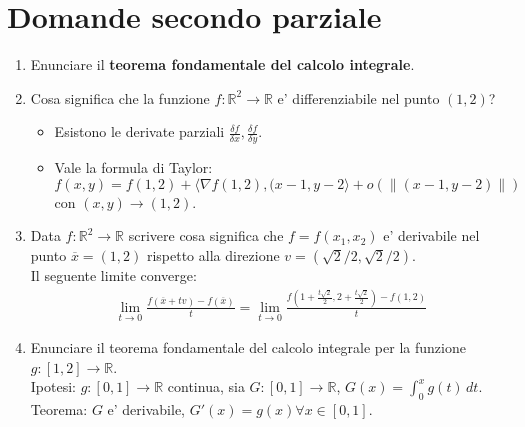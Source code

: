 \documentclass{article}
\begin{document}
\pagebreak
\section{Domande secondo parziale}

\begin{enumerate}
  \item Enunciare il \textbf{teorema fondamentale del calcolo integrale}.
  \item Cosa significa che la funzione $f: \mathbb{R}^2 \to \mathbb{R}$ e'
    differenziabile nel punto $(1,2)$?
    \begin{itemize}
      \item Esistono le derivate parziali $\frac{\delta f}{\delta x}, \frac{\delta f}{\delta y}$.
      \item Vale la formula di Taylor: $f(x,y) = f(1,2) + \langle \nabla f(1,2),
        (x-1,y-2\rangle + o(\|(x-1, y-2)\|)$ con $(x, y) \to (1, 2)$.
    \end{itemize}

  \item Data $f: \mathbb{R}^2 \to \mathbb{R}$ scrivere cosa significa che $f = f(x_1, x_2)$
    e' derivabile nel punto $\overline{x} = (1,2)$ rispetto alla direzione $v = (\sqrt{2}/2, \sqrt{2}/2)$. \\
    Il seguente limite converge:
    \begin{align*}
      \lim_{t \to 0} \frac{f(\overline{x} + tv) - f(\overline{x})}{t}
      = \lim_{t \to 0} \frac{f(1+\frac{t \sqrt{2}}{2}, 2 + \frac{t \sqrt{2}}{2}) - f(1, 2)}{t}
    \end{align*}

  \item Enunciare il teorema fondamentale del calcolo integrale per la funzione
    $g: [1, 2] \to \mathbb{R}$. \\
    Ipotesi: $g: [0, 1] \to \mathbb{R}$ continua, sia $G: [0, 1] \to \mathbb{R}$,
    $G(x) = \int_0^x g(t) \, dt$. \\
    Teorema: $G$ e' derivabile, $G'(x) = g(x) \forall x \in [0, 1]$.


\end{enumerate}
\end{document}
